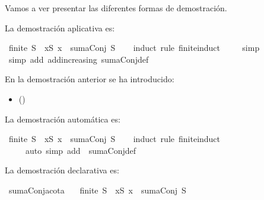 \begin{isabellebody}
\begin{isamarkuptext}
Vamos a ver presentar las diferentes formas de demostración.


La demostración aplicativa es:%
\end{isamarkuptext}\isamarkuptrue%
\isamarkupfalse%
\ {\isachardoublequoteopen}finite\ S\ {\isasymLongrightarrow}\ {\isasymforall}x{\isasymin}S{\isachardot}\ x\ {\isasymle}\ sumaConj\ S{\isachardoublequoteclose}\isanewline
%
\isadelimproof
\ \ %
\endisadelimproof
%
\isatagproof
{}\isamarkupfalse%
\ {\isacharparenleft}induct\ rule{\isacharcolon}\ finite{\isacharunderscore}induct{\isacharparenright}\isanewline
\ \ \ \isamarkupfalse%
\ simp\isanewline
\ \ \isamarkupfalse%
\ {\isacharparenleft}simp\ add{\isacharcolon}\ add{\isacharunderscore}increasing\ sumaConj{\isacharunderscore}def{\isacharparenright}\isanewline
\ \ \isamarkupfalse%
%
\endisatagproof
{\isafoldproof}%
%
\isadelimproof
%
\endisadelimproof
%
\begin{isamarkuptext}%
En la demostración anterior se ha introducido:
 \begin{itemize}
    \item[]  
      \hfill ()
  \end{itemize} 
 La demostración automática es:%
\end{isamarkuptext}\isamarkuptrue%
\isamarkupfalse%
\ {\isachardoublequoteopen}finite\ S\ {\isasymLongrightarrow}\ {\isasymforall}x{\isasymin}S{\isachardot}\ x\ {\isasymle}\ sumaConj\ S{\isachardoublequoteclose}\isanewline
%
\isadelimproof
\ \ %
\endisadelimproof
%
\isatagproof
{}\isamarkupfalse%
\ {\isacharparenleft}induct\ rule{\isacharcolon}\ finite{\isacharunderscore}induct{\isacharparenright}\isanewline
\ \ \ \ \ {\isacharparenleft}auto\ simp\ add{\isacharcolon}\ \ sumaConj{\isacharunderscore}def{\isacharparenright}%
\endisatagproof
{\isafoldproof}%
%
\isadelimproof
%
\endisadelimproof
%
\begin{isamarkuptext}%
La demostración declarativa es:%
\end{isamarkuptext}\isamarkuptrue%
\isamarkupfalse%
\ sumaConj{\isacharunderscore}acota{\isacharcolon}\ \isanewline
\ \ {\isachardoublequoteopen}finite\ S\ {\isasymLongrightarrow}\ {\isasymforall}x{\isasymin}S{\isachardot}\ x\ {\isasymle}\ sumaConj\ S{\isachardoublequoteclose}\isanewline

\end{isabellebody}

